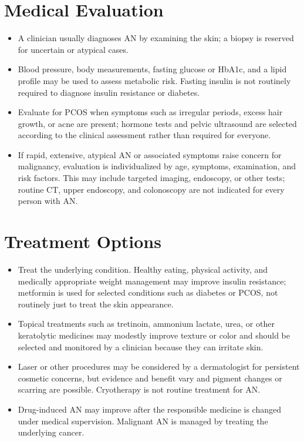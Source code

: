 \section*{Medical Evaluation}
\begin{itemize}
 \item A clinician usually diagnoses AN by examining the skin; a biopsy is reserved for uncertain or atypical cases.
 \item Blood pressure, body measurements, fasting glucose or HbA1c, and a lipid profile may be used to assess metabolic risk. Fasting insulin is not routinely required to diagnose insulin resistance or diabetes.
 \item Evaluate for PCOS when symptoms such as irregular periods, excess hair growth, or acne are present; hormone tests and pelvic ultrasound are selected according to the clinical assessment rather than required for everyone.
 \item If rapid, extensive, atypical AN or associated symptoms raise concern for malignancy, evaluation is individualized by age, symptoms, examination, and risk factors. This may include targeted imaging, endoscopy, or other tests; routine CT, upper endoscopy, and colonoscopy are not indicated for every person with AN.
\end{itemize}

\section*{Treatment Options}
\begin{itemize}
 \item Treat the underlying condition. Healthy eating, physical activity, and medically appropriate weight management may improve insulin resistance; metformin is used for selected conditions such as diabetes or PCOS, not routinely just to treat the skin appearance.
 \item Topical treatments such as tretinoin, ammonium lactate, urea, or other keratolytic medicines may modestly improve texture or color and should be selected and monitored by a clinician because they can irritate skin.
 \item Laser or other procedures may be considered by a dermatologist for persistent cosmetic concerns, but evidence and benefit vary and pigment changes or scarring are possible. Cryotherapy is not routine treatment for AN.
 \item Drug-induced AN may improve after the responsible medicine is changed under medical supervision. Malignant AN is managed by treating the underlying cancer.
\end{itemize}

